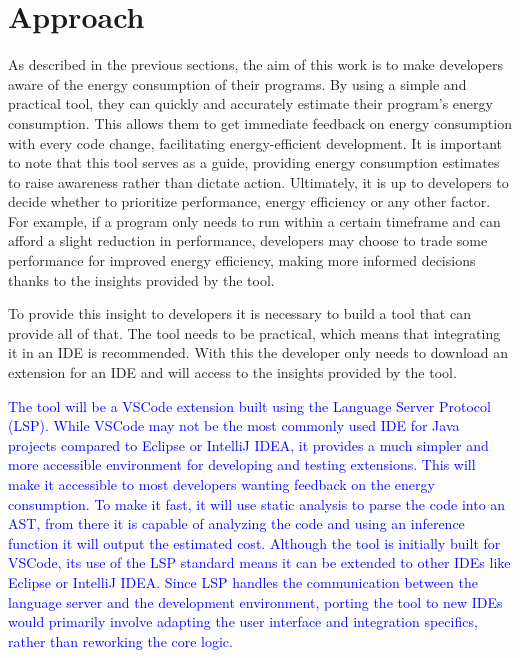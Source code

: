 \usepackage{xcolor}

\usepackage[most]{tcolorbox}
\usepackage{minted}
\usepackage{placeins}



\chapter{Approach}\label{chapter:approach}

As described in the previous sections, the aim of this work is to make developers aware of the energy consumption of their programs. By using a simple and practical tool, they can quickly and accurately estimate their program's energy consumption. This allows them to get immediate feedback on energy consumption with every code change, facilitating energy-efficient development. It is important to note that this tool serves as a guide, providing energy consumption estimates to raise awareness rather than dictate action. Ultimately, it is up to developers to decide whether to prioritize performance, energy efficiency or any other factor. For example, if a program only needs to run within a certain timeframe and can afford a slight reduction in performance, developers may choose to trade some performance for improved energy efficiency, making more informed decisions thanks to the insights provided by the tool.

To provide this insight to developers it is necessary to build a tool that can provide all of that. The tool needs to be practical, which means that integrating it in an IDE is recommended. With this the developer only needs to download an extension for an IDE and will access to the insights provided by the tool.

\textcolor{blue}{
The tool will be a VSCode extension built using the Language Server Protocol (LSP). While VSCode may not be the most commonly used IDE for Java projects compared to Eclipse or IntelliJ IDEA, it provides a much simpler and more accessible environment for developing and testing extensions. This will make it accessible to most developers wanting feedback on the energy consumption. To make it fast, it will use static analysis to parse the code into an AST, from there it is capable of analyzing the code and using an inference function it will output the estimated cost.
Although the tool is initially built for VSCode, its use of the LSP standard means it can be extended to other IDEs like Eclipse or IntelliJ IDEA. Since LSP handles the communication between the language server and the development environment, porting the tool to new IDEs would primarily involve adapting the user interface and integration specifics, rather than reworking the core logic.}


